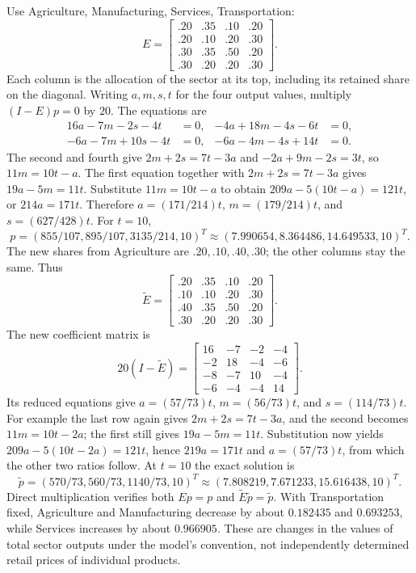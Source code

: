 Use Agriculture, Manufacturing, Services, Transportation:
\[E=\begin{bmatrix}.20&.35&.10&.20\\.20&.10&.20&.30\\
.30&.35&.50&.20\\.30&.20&.20&.30\end{bmatrix}.\]
Each column is the allocation of the sector at its top, including its
retained share on the diagonal.
Writing $a,m,s,t$ for the four output values, multiply $(I-E)p=0$
by $20$. The equations are
\begin{align*}
16a-7m-2s-4t&=0,&-4a+18m-4s-6t&=0,\\
-6a-7m+10s-4t&=0,&-6a-4m-4s+14t&=0.
\end{align*}
The second and fourth give $2m+2s=7t-3a$ and
$-2a+9m-2s=3t$, so $11m=10t-a$.
The first equation together with $2m+2s=7t-3a$ gives
$19a-5m=11t$. Substitute $11m=10t-a$ to obtain
$209a-5(10t-a)=121t$, or $214a=171t$. Therefore
$a=(171/214)t$, $m=(179/214)t$, and $s=(627/428)t$.
For $t=10$,
\[p=(855/107,895/107,3135/214,10)^T
\approx(7.990654,8.364486,14.649533,10)^T.\]
The new shares from Agriculture are $.20,.10,.40,.30$;
the other columns stay the same. Thus
\[\widetilde E=\begin{bmatrix}.20&.35&.10&.20\\.10&.10&.20&.30\\
.40&.35&.50&.20\\.30&.20&.20&.30\end{bmatrix}.\]
The new coefficient matrix is
\[20(I-\widetilde E)=\begin{bmatrix}
16&-7&-2&-4\\-2&18&-4&-6\\-8&-7&10&-4\\-6&-4&-4&14
\end{bmatrix}.\]
Its reduced equations give $a=(57/73)t$, $m=(56/73)t$,
and $s=(114/73)t$. For example the last row again gives
$2m+2s=7t-3a$, and the second becomes $11m=10t-2a$;
the first still gives $19a-5m=11t$. Substitution now yields
$209a-5(10t-2a)=121t$, hence $219a=171t$ and
$a=(57/73)t$, from which the other two ratios follow.
At $t=10$ the exact solution is
\[\widetilde p=(570/73,560/73,1140/73,10)^T
\approx(7.808219,7.671233,15.616438,10)^T.\]
Direct multiplication verifies both $Ep=p$ and
$\widetilde E\widetilde p=\widetilde p$.
With Transportation fixed, Agriculture and Manufacturing decrease
by about $0.182435$ and $0.693253$, while Services increases by
about $0.966905$. These are changes in the values of total sector
outputs under the model's convention, not independently determined
retail prices of individual products.


